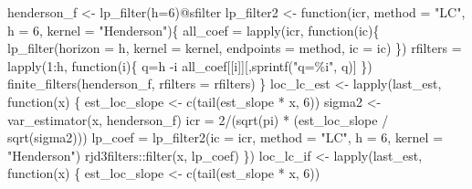 \documentclass[
]{article}
\newenvironment{Shaded}{\begin{snugshade}}{\end{snugshade}}
\newcommand{\AttributeTok}[1]{\textcolor[rgb]{0.40,0.45,0.13}{#1}}
\newcommand{\ControlFlowTok}[1]{\textcolor[rgb]{0.00,0.23,0.31}{#1}}
\newcommand{\DecValTok}[1]{\textcolor[rgb]{0.68,0.00,0.00}{#1}}
\newcommand{\FunctionTok}[1]{\textcolor[rgb]{0.28,0.35,0.67}{#1}}
\newcommand{\NormalTok}[1]{\textcolor[rgb]{0.00,0.23,0.31}{#1}}
\newcommand{\OtherTok}[1]{\textcolor[rgb]{0.00,0.23,0.31}{#1}}
\newcommand{\SpecialCharTok}[1]{\textcolor[rgb]{0.37,0.37,0.37}{#1}}
\newcommand{\StringTok}[1]{\textcolor[rgb]{0.13,0.47,0.30}{#1}}
\newcommand\1{\mathds{1}}
\begin{document}
\begin{Shaded}
\begin{Highlighting}[]
\NormalTok{henderson\_f }\OtherTok{\textless{}{-}} \FunctionTok{lp\_filter}\NormalTok{(}\AttributeTok{h=}\DecValTok{6}\NormalTok{)}\SpecialCharTok{@}\NormalTok{sfilter}
\NormalTok{lp\_filter2 }\OtherTok{\textless{}{-}} \ControlFlowTok{function}\NormalTok{(icr, }\AttributeTok{method =} \StringTok{"LC"}\NormalTok{, }\AttributeTok{h =} \DecValTok{6}\NormalTok{, }\AttributeTok{kernel =} \StringTok{"Henderson"}\NormalTok{)\{}
\NormalTok{  all\_coef }\OtherTok{=} \FunctionTok{lapply}\NormalTok{(icr, }\ControlFlowTok{function}\NormalTok{(ic)\{}
    \FunctionTok{lp\_filter}\NormalTok{(}\AttributeTok{horizon =}\NormalTok{ h,}
              \AttributeTok{kernel =}\NormalTok{ kernel,}
              \AttributeTok{endpoints =}\NormalTok{ method,}
              \AttributeTok{ic =}\NormalTok{ ic)}
\NormalTok{  \})}
\NormalTok{  rfilters }\OtherTok{=} \FunctionTok{lapply}\NormalTok{(}\DecValTok{1}\SpecialCharTok{:}\NormalTok{h, }\ControlFlowTok{function}\NormalTok{(i)\{}
\NormalTok{    q}\OtherTok{=}\NormalTok{h }\SpecialCharTok{{-}}\NormalTok{i}
\NormalTok{    all\_coef[[i]][,}\FunctionTok{sprintf}\NormalTok{(}\StringTok{"q=\%i"}\NormalTok{, q)]}
\NormalTok{  \})}
  \FunctionTok{finite\_filters}\NormalTok{(henderson\_f, }\AttributeTok{rfilters =}\NormalTok{ rfilters)}
\NormalTok{\}}
\NormalTok{loc\_lc\_est }\OtherTok{\textless{}{-}}
  \FunctionTok{lapply}\NormalTok{(last\_est, }\ControlFlowTok{function}\NormalTok{(x) \{}
\NormalTok{    est\_loc\_slope }\OtherTok{\textless{}{-}} \FunctionTok{c}\NormalTok{(}\FunctionTok{tail}\NormalTok{(est\_slope }\SpecialCharTok{*}\NormalTok{ x, }\DecValTok{6}\NormalTok{))}
\NormalTok{    sigma2 }\OtherTok{\textless{}{-}} \FunctionTok{var\_estimator}\NormalTok{(x, henderson\_f)}
\NormalTok{    icr }\OtherTok{=} \DecValTok{2}\SpecialCharTok{/}\NormalTok{(}\FunctionTok{sqrt}\NormalTok{(pi) }\SpecialCharTok{*}\NormalTok{ (est\_loc\_slope }\SpecialCharTok{/} \FunctionTok{sqrt}\NormalTok{(sigma2)))}
\NormalTok{    lp\_coef }\OtherTok{=} \FunctionTok{lp\_filter2}\NormalTok{(}\AttributeTok{ic =}\NormalTok{ icr,}
                         \AttributeTok{method =} \StringTok{"LC"}\NormalTok{, }\AttributeTok{h =} \DecValTok{6}\NormalTok{, }\AttributeTok{kernel =} \StringTok{"Henderson"}\NormalTok{)}
\NormalTok{    rjd3filters}\SpecialCharTok{::}\FunctionTok{filter}\NormalTok{(x, lp\_coef)}
\NormalTok{  \})}
\NormalTok{loc\_lc\_if }\OtherTok{\textless{}{-}}
  \FunctionTok{lapply}\NormalTok{(last\_est, }\ControlFlowTok{function}\NormalTok{(x) \{}
\NormalTok{    est\_loc\_slope }\OtherTok{\textless{}{-}} \FunctionTok{c}\NormalTok{(}\FunctionTok{tail}\NormalTok{(est\_slope }\SpecialCharTok{*}\NormalTok{ x, }\DecValTok{6}\NormalTok{))}

\end{Highlighting}
\end{Shaded}
\end{document}
